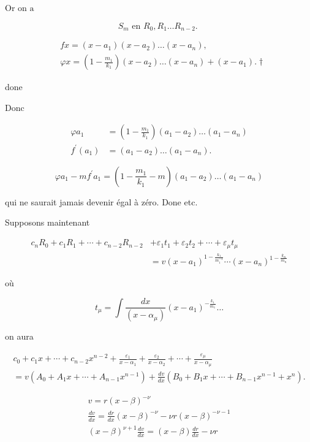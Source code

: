 \documentclass{article}
\begin{document}
\(\mathrm{Or}\) on \(\mathrm{a}\)

\[
S_{m} \text { en } R_{0}, R_{1} \ldots R_{n-2} \text {. }
\]

\[
\begin{aligned}
& f x=\left(x-a_{1}\right)\left(x-a_{2}\right) \ldots\left(x-a_{n}\right), \\
& \varphi x=\left(1-\frac{m_{1}}{k_{1}}\right)\left(x-a_{2}\right) \ldots\left(x-a_{n}\right)+\left(x-a_{1}\right) . \dagger
\end{aligned}
\]

done

Donc

\[
\begin{aligned}
\varphi a_{1} & =\left(1-\frac{m_{1}}{k_{1}}\right)\left(a_{1}-a_{2}\right) \ldots\left(a_{1}-a_{n}\right) \\
f^{\prime}\left(a_{1}\right) & =\left(a_{1}-a_{2}\right) \ldots\left(a_{1}-a_{n}\right) .
\end{aligned}
\]

\[
\varphi a_{1}-m f^{\prime} a_{1}=\left(1-\frac{m_{1}}{k_{1}}-m\right)\left(a_{1}-a_{2}\right) \ldots\left(a_{1}-a_{n}\right)
\]

qui ne saurait jamais devenir égal à zéro. Done etc.

Supposons maintenant

\[
\begin{aligned}
c_{n} R_{0}+c_{1} R_{1}+\cdots+c_{n-2} R_{n-2} & +\varepsilon_{1} t_{1}+\varepsilon_{2} t_{2}+\cdots+\varepsilon_{\mu} t_{\mu} \\
& =v\left(x-a_{1}\right)^{1-\frac{k_{1}}{m_{1}^{-1}}} \cdots\left(x-a_{n}\right)^{1-\frac{k_{n}}{m_{n}}}
\end{aligned}
\]

où

\[
t_{\mu}=\int \frac{d x}{\left(x-\alpha_{\mu}\right)}\left(x-a_{1}\right)^{-\frac{k_{1}}{m_{1}}} \ldots
\]

on aura

\[
\begin{gathered}
c_{0}+c_{1} x+\cdots+c_{n-2} x^{n-2}+\frac{\varepsilon_{1}}{x-\alpha_{1}}+\frac{\varepsilon_{2}}{x-\alpha_{2}}+\cdots+\frac{\varepsilon_{\mu}}{x-\alpha_{\mu}} \\
=v\left(A_{0}+A_{1} x+\cdots+A_{n-1} x^{n-1}\right)+\frac{d v}{d x}\left(B_{0}+B_{1} x+\cdots+B_{n-1} x^{n-1}+x^{n}\right) .
\end{gathered}
\]

\[
\begin{gathered}
v=r(x-\beta)^{-\nu} \\
\frac{d v}{d x}=\frac{d r}{d x}(x-\beta)^{-\nu}-\nu r(x-\beta)^{-\nu-1} \\
(x-\beta)^{\nu+1} \frac{d v}{d x}=(x-\beta) \frac{d r}{d x}-\nu r
\end{gathered}
\]
\end{document}
